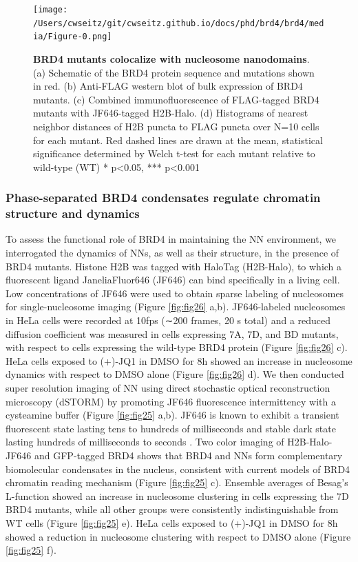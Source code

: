 \begin{figure}[t]
\texttt{[image: /Users/cwseitz/git/cwseitz.github.io/docs/phd/brd4/brd4/media/Figure-0.png]}
\caption{\textbf{BRD4 mutants colocalize with nucleosome nanodomains}. (a) Schematic of the BRD4 protein sequence and mutations shown in red. (b) Anti-FLAG western blot of bulk expression of BRD4 mutants. (c) Combined immunofluorescence of FLAG-tagged BRD4 mutants with JF646-tagged H2B-Halo. (d) Histograms of nearest neighbor distances of H2B puncta to FLAG puncta over N=10 cells for each mutant. Red dashed lines are drawn at the mean, statistical significance determined by Welch t-test for each mutant relative to wild-type (WT) * p<0.05, *** p<0.001}
\label{fig:fig23}
\end{figure}
	
\subsubsection{Phase-separated BRD4 condensates regulate chromatin structure and dynamics}

To assess the functional role of BRD4 in maintaining the NN environment, we interrogated the dynamics of NNs, as well as their structure, in the presence of BRD4 mutants. Histone H2B was tagged with HaloTag \parencite{Los2008} (H2B-Halo), to which a fluorescent ligand JaneliaFluor646 (JF646) can bind speciﬁcally in a living cell. Low concentrations of JF646 were used to obtain sparse labeling of nucleosomes for single-nucleosome imaging (Figure \ref{fig:fig26} a,b). JF646-labeled nucleosomes in HeLa cells were recorded at 10fps (∼200 frames, 20 s total) and a reduced diffusion coefficient was measured in cells expressing 7A, 7D, and BD mutants, with respect to cells expressing the wild-type BRD4 protein (Figure \ref{fig:fig26} c). HeLa cells exposed to (+)-JQ1 in DMSO for 8h showed an increase in nucleosome dynamics with respect to DMSO alone (Figure \ref{fig:fig26} d). We then conducted super resolution imaging of NN using direct stochastic optical reconstruction microscopy (dSTORM) by promoting JF646 fluorescence intermittency with a cysteamine buffer (Figure \ref{fig:fig25} a,b). JF646 is known to exhibit a transient fluorescent state lasting tens to hundreds of milliseconds and stable dark state lasting hundreds of milliseconds to seconds \parencite{Grimm2015}. Two color imaging of H2B-Halo-JF646 and GFP-tagged BRD4 shows that BRD4 and NNs form complementary biomolecular condensates in the nucleus, consistent with current models of BRD4 chromatin reading mechanism (Figure \ref{fig:fig25} c). Ensemble averages of Besag’s L-function showed an increase in nucleosome clustering in cells expressing the 7D BRD4 mutants, while all other groups were consistently indistinguishable from WT cells (Figure \ref{fig:fig25} e). HeLa cells exposed to (+)-JQ1 in DMSO for 8h showed a reduction in nucleosome clustering with respect to DMSO alone (Figure \ref{fig:fig25} f).  


